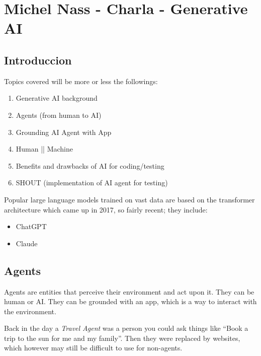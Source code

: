 \chapter{Michel Nass - Charla - Generative AI}

\section{Introduccion}


Topics covered will be more or less the followings:
\begin{enumerate}
   \item Generative AI background
   \item Agents (from human to AI)
   \item Grounding AI Agent with App
   \item Human || Machine
   \item Benefits and drawbacks of AI for coding/testing
   \item SHOUT (implementation of AI agent for testing)
\end{enumerate}

Popular large language models trained on vast data are based on the transformer architecture which came up in 2017, so fairly recent; they include:
\begin{itemize}
   \item ChatGPT
   \item Claude
\end{itemize}

\section{Agents}

Agents are entities that perceive their environment and act upon it. They can be human or AI. They can be grounded with an app, which is a way to interact with the environment.

Back in the day a \textit{Travel Agent} was a person you could ask things like ``Book a trip to the sun for me and my family''.
Then they were replaced by websites, which however may still be difficult to use for non-agents.